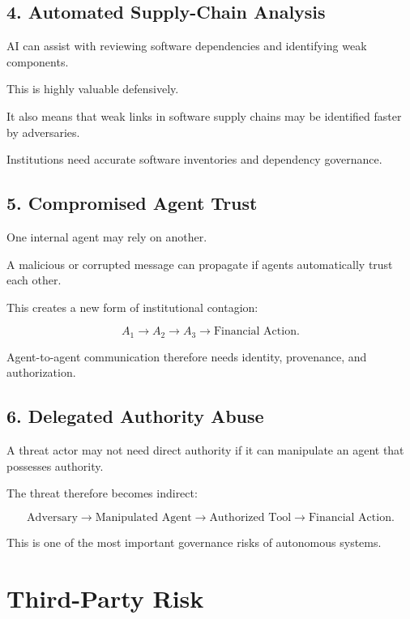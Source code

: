 \subsection{4. Automated Supply-Chain Analysis}

AI can assist with reviewing software dependencies and identifying weak components.

This is highly valuable defensively.

It also means that weak links in software supply chains may be identified faster by adversaries.

Institutions need accurate software inventories and dependency governance.

\subsection{5. Compromised Agent Trust}

One internal agent may rely on another.

A malicious or corrupted message can propagate if agents automatically trust each other.

This creates a new form of institutional contagion:

\begin{equation}
A_1
\rightarrow
A_2
\rightarrow
A_3
\rightarrow
\text{Financial Action}.
\end{equation}

Agent-to-agent communication therefore needs identity, provenance, and authorization.

\subsection{6. Delegated Authority Abuse}

A threat actor may not need direct authority if it can manipulate an agent that possesses authority.

The threat therefore becomes indirect:

\begin{equation}
\text{Adversary}
\rightarrow
\text{Manipulated Agent}
\rightarrow
\text{Authorized Tool}
\rightarrow
\text{Financial Action}.
\end{equation}

This is one of the most important governance risks of autonomous systems.

\section{Third-Party Risk}

